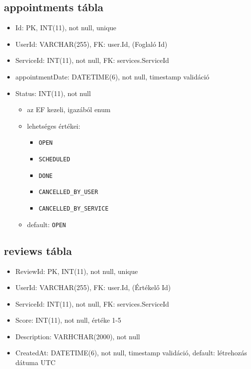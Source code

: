 \documentclass[11pt]{article}
\begin{document}
\subsection{appointments tábla}
\label{sec:orgd2020e7}
\begin{itemize}
\item Id:  PK, INT(11), not null, unique
\item UserId: VARCHAR(255), FK: user.Id, (Foglaló Id)
\item ServiceId: INT(11), not null, FK: services.ServiceId
\item appointmentDate: DATETIME(6), not null, timestamp validáció
\item Status: INT(11), not null
\begin{itemize}
\item az EF kezeli, igazából enum
\item lehetséges értékei:
\begin{itemize}
\item \texttt{OPEN}
\item \texttt{SCHEDULED}
\item \texttt{DONE}
\item \texttt{CANCELLED\_BY\_USER}
\item \texttt{CANCELLED\_BY\_SERVICE}
\end{itemize}
\item default: \texttt{OPEN}
\end{itemize}
\end{itemize}
\subsection{reviews tábla}
\label{sec:orgede2ee4}
\begin{itemize}
\item ReviewId: PK, INT(11), not null, unique
\item UserId: VARCHAR(255), FK: user.Id, (Értékelő Id)
\item ServiceId: INT(11), not null, FK: services.ServiceId
\item Score: INT(11), not null, értéke 1-5
\item Description: VARHCHAR(2000), not null
\item CreatedAt: DATETIME(6), not null, timestamp validáció, default: létrehozás dátuma UTC
\end{itemize}
\end{document}
